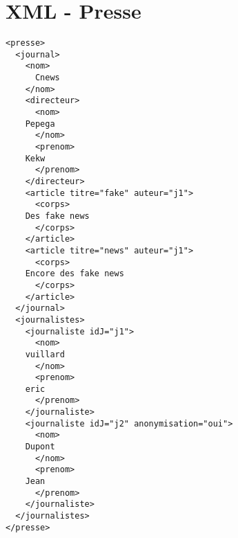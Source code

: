 \chapter{XML - Presse}
\begin{verbatim}
<presse>
  <journal>
    <nom>
      Cnews
    </nom>
    <directeur>
      <nom>
	Pepega
      </nom>
      <prenom>
	Kekw
      </prenom>
    </directeur>
    <article titre="fake" auteur="j1">
      <corps>
	Des fake news
      </corps>
    </article>
    <article titre="news" auteur="j1">
      <corps>
	Encore des fake news
      </corps>
    </article>
  </journal>
  <journalistes>
    <journaliste idJ="j1">
      <nom>
	vuillard
      </nom>
      <prenom>
	eric
      </prenom>
    </journaliste>
    <journaliste idJ="j2" anonymisation="oui">
      <nom>
	Dupont
      </nom>
      <prenom>
	Jean
      </prenom>
    </journaliste>
  </journalistes>
</presse>
\end{verbatim}

